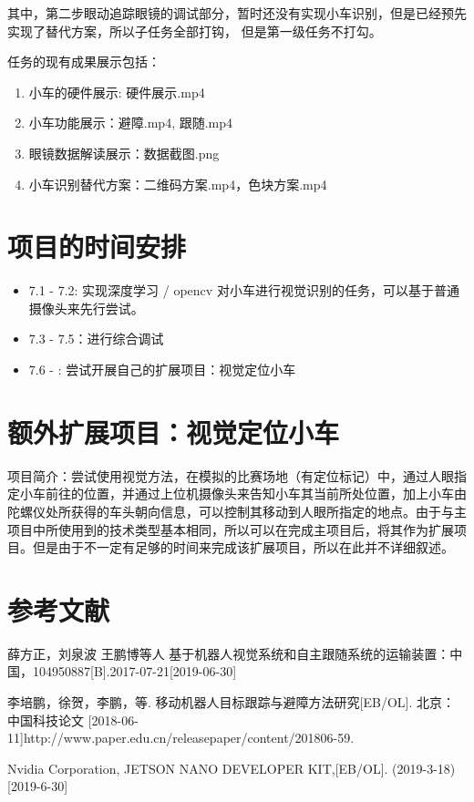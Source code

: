 \documentclass{article}
\begin{document}
\begin{spacing}{1.5}
其中，第二步眼动追踪眼镜的调试部分，暂时还没有实现小车识别，但是已经预先实现了替代方案，所以子任务全部打钩，
但是第一级任务不打勾。

任务的现有成果展示包括：
\begin{enumerate}
    \item 小车的硬件展示: 硬件展示.mp4
    \item 小车功能展示：避障.mp4, 跟随.mp4
    \item 眼镜数据解读展示：数据截图.png
    \item 小车识别替代方案：二维码方案.mp4，色块方案.mp4
\end{enumerate}

\section{项目的时间安排}

\begin{itemize}
    \item 7.1 - 7.2: 实现深度学习 / opencv 对小车进行视觉识别的任务，可以基于普通摄像头来先行尝试。
    \item 7.3 - 7.5：进行综合调试 
    \item 7.6 -    : 尝试开展自己的扩展项目：视觉定位小车
\end{itemize}

\section{额外扩展项目：视觉定位小车}

项目简介：尝试使用视觉方法，在模拟的比赛场地（有定位标记）中，通过人眼指定小车前往的位置，并通过上位机摄像头来告知小车其当前所处位置，加上小车由陀螺仪处所获得的车头朝向信息，可以控制其移动到人眼所指定的地点。由于与主项目中所使用到的技术类型基本相同，所以可以在完成主项目后，将其作为扩展项目。但是由于不一定有足够的时间来完成该扩展项目，所以在此并不详细叙述。


\section{参考文献}


\noindent [1] 薛方正，刘泉波 王鹏博等人 基于机器人视觉系统和自主跟随系统的运输装置：中国，104950887[B].2017-07-21[2019-06-30]

\noindent [2] 李培鹏，徐贺，李鹏，等. 移动机器人目标跟踪与避障方法研究[EB/OL]. 北京：中国科技论文 [2018-06-11]http://www.paper.edu.cn/releasepaper/content/201806-59.

\noindent [3] Nvidia Corporation, JETSON NANO DEVELOPER KIT,[EB/OL]. (2019-3-18)[2019-6-30]

    
    

 

    
    
    



\end{spacing}
\end{document}
